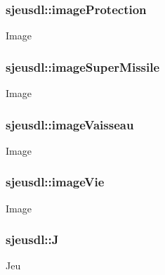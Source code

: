 \subsubsection[{\texorpdfstring{image\+Protection}{imageProtection}}]{ sjeusdl\+::image\+Protection}\hypertarget{structsjeusdl_a1bfac9bb34a0abd3e39c2002e693ae1f}{}\label{structsjeusdl_a1bfac9bb34a0abd3e39c2002e693ae1f}
Image 
\subsubsection[{\texorpdfstring{image\+Super\+Missile}{imageSuperMissile}}]{ sjeusdl\+::image\+Super\+Missile}\hypertarget{structsjeusdl_aa6416df0136ba8798cc8db19f476de7a}{}\label{structsjeusdl_aa6416df0136ba8798cc8db19f476de7a}
Image 
\subsubsection[{\texorpdfstring{image\+Vaisseau}{imageVaisseau}}]{ sjeusdl\+::image\+Vaisseau}\hypertarget{structsjeusdl_a3cf542984026079c3aba96a4e2c5329c}{}\label{structsjeusdl_a3cf542984026079c3aba96a4e2c5329c}
Image 
\subsubsection[{\texorpdfstring{image\+Vie}{imageVie}}]{ sjeusdl\+::image\+Vie}\hypertarget{structsjeusdl_aab12033de9a989631b45a552ba538bd0}{}\label{structsjeusdl_aab12033de9a989631b45a552ba538bd0}
Image 
\subsubsection[{\texorpdfstring{J}{J}}]{ sjeusdl\+::J}\hypertarget{structsjeusdl_a3c824847fb4915d7636f57e3c1ff0d54}{}\label{structsjeusdl_a3c824847fb4915d7636f57e3c1ff0d54}
Jeu 
